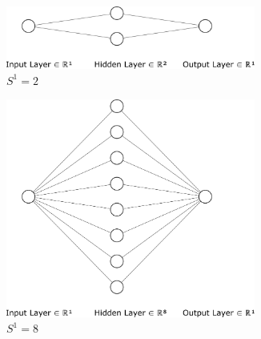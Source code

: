 \begin{figure}[htpb]
	\centering
	\begin{subfigure}{0.47\textwidth}
		\centering
		\includegraphics[width=0.9\textwidth]{../Problem 4/nn_1_2_1.pdf}
		\caption{$S^1=2$}
	\end{subfigure}
	\begin{subfigure}{0.47\textwidth}
		\centering
		\includegraphics[width=0.9\textwidth]{../Problem 4/nn_1_8_1.pdf}
		\caption{$S^1=8$}
	\end{subfigure}
	\begin{subfigure}{0.47\textwidth}
		\centering

\end{subfigure}
\end{figure}
